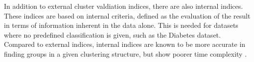 In addition to external cluster valdiation indices, there are also internal indices. These indices are based on internal criteria, defined as the evaluation of the result in terms of information inherent in the data alone. This is needed for datasets where no predefined classification is given, such as the Diabetes dataset. Compared to external indices, internal indices are known to be more accurate in finding groups in a given clustering structure, but show poorer time complexity \cite{int_ext}. 